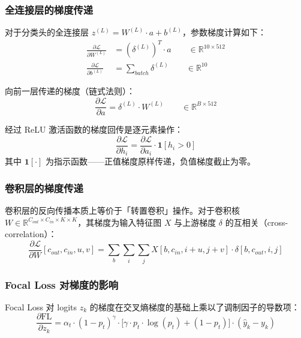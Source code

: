 \documentclass[11pt,a4paper]{ctexart}
\newcommand{\rb}[1]{\ensuremath{\mathbb{R}^{#1}}}
\begin{document}
\subsubsection{全连接层的梯度传递}

对于分类头的全连接层 $z^{(L)} = W^{(L)} \cdot a + b^{(L)}$，参数梯度计算如下：
\begin{align}
\frac{\partial \mathcal{L}}{\partial W^{(L)}} &= (\delta^{(L)})^T \cdot a \qquad \in \rb{10 \times 512} \\
\frac{\partial \mathcal{L}}{\partial b^{(L)}} &= \sum_{batch} \delta^{(L)} \qquad \in \rb{10}
\end{align}

向前一层传递的梯度（链式法则）：
\begin{equation}
\frac{\partial \mathcal{L}}{\partial a} = \delta^{(L)} \cdot W^{(L)} \qquad \in \rb{B \times 512}
\end{equation}

经过 ReLU 激活函数的梯度回传是逐元素操作：
\begin{equation}
\frac{\partial \mathcal{L}}{\partial h_i} = \frac{\partial \mathcal{L}}{\partial a_i} \cdot \mathbf{1}[h_i > 0]
\end{equation}
其中 $\mathbf{1}[\cdot]$ 为指示函数——正值梯度原样传递，负值梯度截止为零。

\subsubsection{卷积层的梯度传递}

卷积层的反向传播本质上等价于「转置卷积」操作。对于卷积核 $W \in \rb{C_{out} \times C_{in} \times K \times K}$，其梯度为输入特征图 $X$ 与上游梯度 $\delta$ 的互相关（cross-correlation）：
\begin{equation}
\frac{\partial \mathcal{L}}{\partial W}[c_{out}, c_{in}, u, v] = \sum_{b} \sum_{i} \sum_{j} X[b, c_{in}, i+u, j+v] \cdot \delta[b, c_{out}, i, j]
\end{equation}

\subsubsection{Focal Loss 对梯度的影响}

Focal Loss 对 logits $z_k$ 的梯度在交叉熵梯度的基础上乘以了调制因子的导数项：
\begin{equation}
\frac{\partial \mathrm{FL}}{\partial z_k} = \alpha_t \cdot (1-p_t)^\gamma \cdot \bigl[\gamma \cdot p_t \cdot \log(p_t) + (1-p_t)\bigr] \cdot (\hat{y}_k - y_k)
\end{equation}
\end{document}
